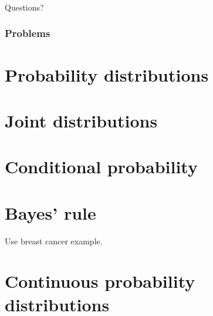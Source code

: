 \documentclass{beamer}
\begin{document}
	\begin{frame}
		\frametitle{}
		\Large Questions?
	\end{frame}
	
	
	\begin{frame}
		\frametitle{Problems}
		
		
		
	\end{frame}


	\section{Probability distributions}


	\section{Joint distributions}
	\frame{\tableofcontents[currentsection]}

	\section{Conditional probability}
	\frame{\tableofcontents[currentsection]}
	
	\section{Bayes' rule}
	\frame{\tableofcontents[currentsection]}
	
	Use breast cancer example.
	
	\section{Continuous probability distributions}
	\frame{\tableofcontents[currentsection]}
	
\end{document}
